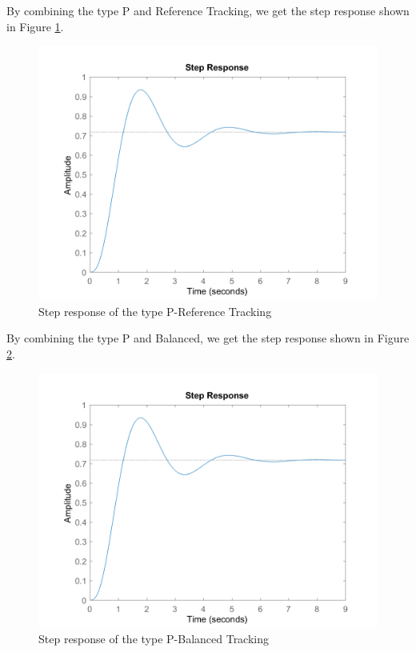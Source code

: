 \documentclass[a4paper, twocolumn, titlepage, 10pt]{article}
\begin{document}
		By combining the type P and Reference Tracking, we get the step response shown in Figure \ref{p-track-step}.
		\begin{figure}[H]
			\centering
			\includegraphics[width=\linewidth]{p-track-step}
			\caption{Step response of the type P-Reference Tracking}
			\label{p-track-step} 
		\end{figure}
		By combining the type P and Balanced, we get the step response shown in Figure \ref{p-balance-step}. 
		\begin{figure}[H]
			\centering
			\includegraphics[width=\linewidth]{p-balance-step}
			\caption{Step response of the type P-Balanced Tracking}
			\label{p-balance-step} 
		\end{figure}
\end{document}
